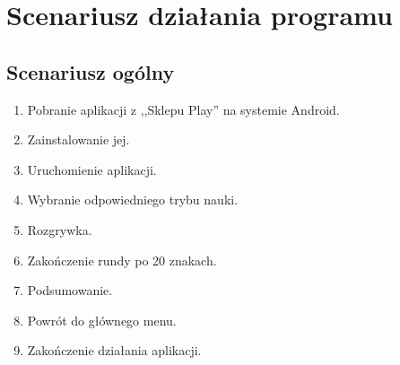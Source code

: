 \documentclass[15pt]{article}
\begin{document}
\section{Scenariusz działania programu}
\subsection{Scenariusz ogólny}
\begin{enumerate}
\item Pobranie aplikacji z ,,Sklepu Play'' na systemie Android.
\item Zainstalowanie jej.
\item Uruchomienie aplikacji.
\item Wybranie odpowiedniego trybu nauki.
\item Rozgrywka.
\item Zakończenie rundy po 20 znakach.
\item Podsumowanie.
\item Powrót do głównego menu.
\item Zakończenie działania aplikacji.

\end{enumerate}
\newpage
\end{document}
